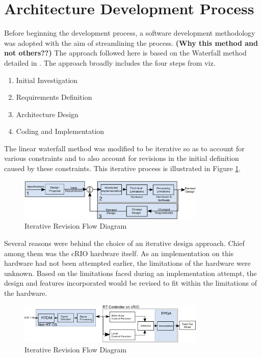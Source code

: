 \documentclass[conference]{IEEEtran}
\begin{document}
\section{Architecture Development Process}\label{arch}

Before beginning the development process, a software development methodology was adopted with the aim of streamlining the process. \textbf{(Why this method and not others??)} The approach followed here is based on the Waterfall method detailed in \cite{WaterfallCoding}. The approach broadly includes the four steps from \cite{WaterfallCoding} viz. 

\begin{enumerate}
\item Initial Investigation
\item Requirements Definition
\item Architecture Design
\item Coding and Implementation
\end{enumerate}

The linear waterfall method was modified to be iterative so as to account for various constraints and to also account for revisions in the initial definition caused by these constraints. This iterative process is illustrated in Figure \ref{fig:RevisionFlow}.

\begin{figure}[!ht]
\centering
\includegraphics[width=3.5in]{RevisionFlow.png} 
\caption{Iterative Revision Flow Diagram}
\label{fig:RevisionFlow}
\end{figure}

Several reasons were behind the choice of an iterative design approach. Chief among them was the cRIO hardware itself. As an implementation on this hardware had not been attempted earlier, the limitations of the hardware were unknown. Based on the limitations faced during an implementation attempt, the design and features incorporated would be revised to fit within the limitations of the hardware. \\

\begin{figure}[!ht]
\centering
\includegraphics[width=3.5in]{Revision.png} 
\caption{Iterative Revision Flow Diagram}
\label{Revision1}
\end{figure}
\end{document}
